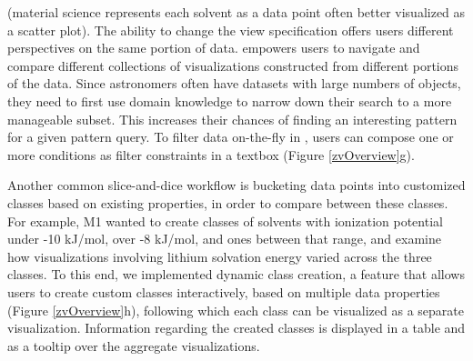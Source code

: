 (material science represents each solvent 
as a data point often better visualized as a scatter plot). 
The ability to change the view specification 
offers users different perspectives on the same portion of data.
 empowers users to 
navigate and compare different collections 
of visualizations constructed 
from  different portions of the data. 
Since astronomers often have datasets 
with large numbers of objects, 
they need to first use domain knowledge 
to narrow down their search to a more manageable subset.
This increases their chances of finding an 
interesting pattern for a given pattern query. 
To filter data on-the-fly in \zvpp, 
users can compose one or more conditions 
as filter constraints in a textbox (Figure \ref{zvOverview}g). 
\par Another common slice-and-dice workflow is 
bucketing data points into customized classes 
based on existing properties, in order to compare between these classes. 
For example, M1 wanted to create classes of solvents with ionization potential under -10 kJ/mol, over -8 kJ/mol, and ones between that range, and 
examine how visualizations involving lithium solvation energy 
varied across the three classes. 
To this end, we implemented dynamic class creation, 
a feature that allows users to create custom classes interactively, 
based on multiple data properties (Figure \ref{zvOverview}h),
following which each class can be visualized as a separate visualization. 
Information regarding the created classes is displayed in a table and as a tooltip over the aggregate visualizations.
%
